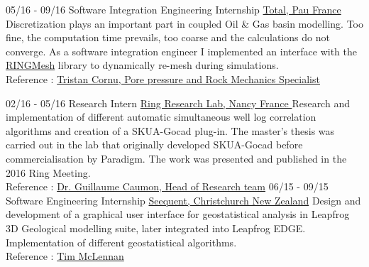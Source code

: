 \documentclass[]{friggeri-cv}
\begin{document}
    \vspace*{\fill}
    \newpage
    \vspace*{18pt}
\begin{entrylist}
  \entry
    {05/16 - 09/16}
    {Software Integration Engineering Internship}
    {\href{https://www.total.com/en}{Total, Pau France}}
    {Discretization plays an important part in coupled Oil \& Gas basin modelling. Too fine, the computation time prevails, too coarse and the calculations do not converge. As a software integration engineer I implemented an interface with the \href{http://www.ring-team.org/software/ringmesh}{RINGMesh} library to dynamically re-mesh during simulations.\\ Reference : \href{mailto:tristan.cornu@total.com}{Tristan Cornu, Pore pressure and Rock Mechanics Specialist}}

    \entry
    {02/16 - 05/16}
    {Research Intern}
    {\href{http://www.ring-team.org/}{Ring Research Lab, Nancy France }}
    {Research and implementation of different automatic simultaneous well log correlation algorithms and creation of a SKUA-Gocad plug-in. The master's thesis was carried out in the lab that originally developed SKUA-Gocad before commercialisation by Paradigm. The work was presented and published in the 2016 Ring Meeting. \\Reference : \href{mailto:Guillaume.Caumon@ensg.univ-lorraine.fr}{Dr. Guillaume Caumon, Head of Research team}}
    \entry
    {06/15 - 09/15}
    {Software Engineering Internship}
    {\href{https://www.seequent.com/}{Seequent, Christchurch New Zealand}}
    {Design and development of a graphical user interface for geostatistical analysis in Leapfrog 3D Geological modelling suite, later integrated into Leapfrog EDGE. Implementation of different geostatistical algorithms.
    \\
    Reference : \href{mailto:tim.mclennan@seequent.com}{Tim McLennan}}


\end{entrylist}
\end{document}
